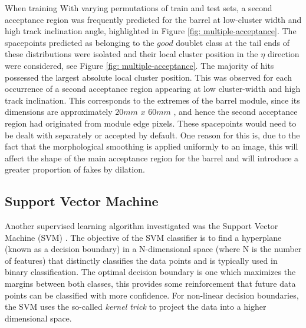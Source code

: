 When training With varying permutations of train and test sets, a second acceptance region was frequently predicted for the barrel at low-cluster width and high track inclination angle, highlighted in Figure \ref{fig: multiple-acceptance}. The spacepoints predicted as belonging to the $good$ doublet class at the tail ends of these distributions were isolated and their local cluster position in the $\eta$ direction were considered, see Figure \ref{fig: multiple-acceptance}. The majority of hits possessed the largest absolute local cluster position. This was observed for each occurrence of a second acceptance region appearing at low cluster-width and high track inclination. This corresponds to the extremes of the barrel module, since its dimensions are approximately $20mm$ $x$ $60mm$ \cite{pixel-module-dimensions}, and hence the second acceptance region had originated from module edge pixels. These spacepoints would need to be dealt with separately or accepted by default. One reason for this is, due to the fact that the morphological smoothing is applied uniformly to an image, this will affect the shape of the main acceptance region for the barrel and will introduce a greater proportion of fakes by dilation.
    

\subsection{Support Vector Machine}



Another supervised learning algorithm investigated was the Support Vector Machine (SVM) \cite{svm}. The objective of the SVM classifier is to find a hyperplane (known as a decision boundary) in a N-dimensional space (where N is the number of features) that distinctly classifies the data points and is typically used in binary classification. The optimal decision boundary is one which maximizes the margins between both classes, this provides some reinforcement that future data points can be classified with more confidence. For non-linear decision boundaries, the SVM uses the so-called \textit{kernel trick} to project the data into a higher dimensional space. 


